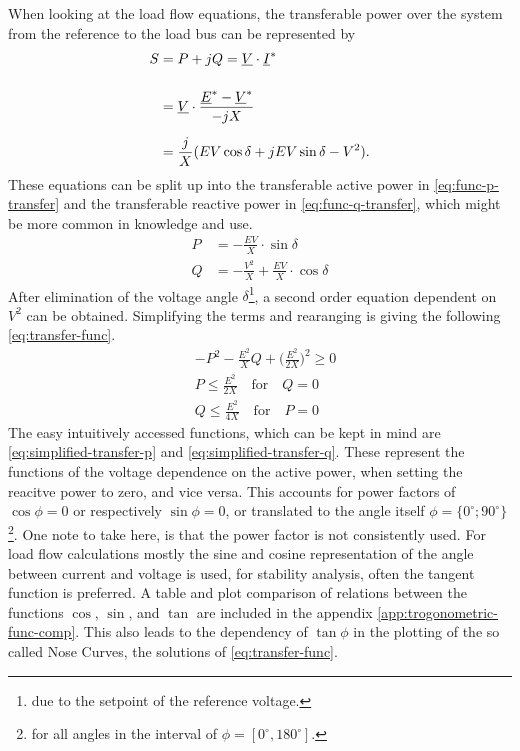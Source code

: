 When looking at the load flow equations, the transferable power over the system from the reference to the load bus can be represented by
\begin{align}
    S&=P + jQ = \underline{V} \cdot \underline{I}^* \notag \\[12pt]
    &=\underline{V} \cdot \frac{\underline{E}^* - \underline{V}^*}{-jX} \notag \\[6pt]
    &=\frac{j}{X} (EV \cos \delta + jEV \sin \delta -V^2). \notag
\end{align}
These equations can be split up into the transferable active power in \autoref{eq:func-p-transfer} and the transferable reactive power in \autoref{eq:func-q-transfer}, which might be more common in knowledge and use.
\begin{align}
    P&=-\frac{EV}{X} \cdot \sin \delta \label{eq:func-p-transfer} \\[6pt]
    Q&=-\frac{V^2}{X} + \frac{EV}{X} \cdot \cos \delta \label{eq:func-q-transfer}
\end{align}
After elimination of the voltage angle $\delta$\footnote{due to the setpoint of the reference voltage.}, a second order equation dependent on $V^2$ can be obtained.
Simplifying the terms and rearanging is giving the following \autoref{eq:transfer-func}.
\begin{align}
    &-P^2 - \frac{E^2}{X}Q + \bigg(\frac{E^2}{2X}\bigg)^2 \geq 0 \label{eq:transfer-func} \\[12pt]
    &P \leq \frac{E^2}{2X} \quad\text{for}\quad Q=0 \label{eq:simplified-transfer-p} \\[6pt]
    &Q \leq \frac{E^2}{4X} \quad\text{for}\quad P=0 \label{eq:simplified-transfer-q}
\end{align}
The easy intuitively accessed functions, which can be kept in mind are \autoref{eq:simplified-transfer-p} and \autoref{eq:simplified-transfer-q}.
These represent the functions of the voltage dependence on the active power, when setting the reacitve power to zero, and vice versa. 
This accounts for power factors of $\cos \phi = 0$ or respectively $\sin \phi = 0$, or translated to the angle itself $\phi = \{0^\circ; 90^\circ\}$\footnote{for all angles in the interval of $\phi = [0^\circ, 180^\circ]$.}.
One note to take here, is that the power factor is not consistently used.
For load flow calculations mostly the sine and cosine representation of the angle between current and voltage is used, for stability analysis, often the tangent function is preferred.
A table and plot comparison of relations between the functions $\cos$, $\sin$, and $\tan$ are included in the appendix \autoref{app:trogonometric-func-comp}. 
This also leads to the dependency of $\tan \phi$ in the plotting of the so called Nose Curves, the solutions of \autoref{eq:transfer-func}.

